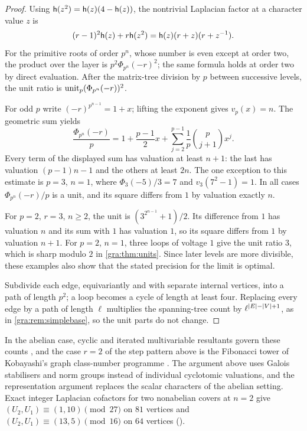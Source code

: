 \begin{proof}
Using $\mathsf{h}(z^2)=\mathsf{h}(z)(4-\mathsf{h}(z))$, the nontrivial Laplacian factor at
a character value $z$ is
\[
 (r-1)^2\mathsf{h}(z)+r\mathsf{h}(z^2)=\mathsf{h}(z)(r+z)(r+z^{-1}).
\]
For the primitive roots of order $p^n$, whose number is even except at
order two, the product over the layer is $p^2\Phi_{p^n}(-r)^2$; the same
formula holds at order two by direct evaluation. After the matrix-tree
division by $p$ between successive levels, the unit ratio is
$\operatorname{unit}_p(\Phi_{p^n}(-r))^2$.

For odd $p$ write $(-r)^{p^{n-1}}=1+x$; lifting the exponent gives
$v_p(x)=n$. The geometric sum yields
\[
 \frac{\Phi_{p^n}(-r)}p=1+\frac{p-1}2x
 +\sum_{j=2}^{p-1}\frac1p\binom p{j+1}x^j .
\]
Every term of the displayed sum has valuation at least $n+1$: the last
has valuation $(p-1)n-1$ and the others at least $2n$. The one exception
to this estimate is $p=3$, $n=1$, where $\Phi_3(-5)/3=7$ and
$v_3(7^2-1)=1$. In all cases $\Phi_{p^n}(-r)/p$ is a unit, and its square
differs from $1$ by valuation exactly $n$.

For $p=2$, $r=3$, $n\ge2$, the unit is $(3^{2^{n-1}}+1)/2$. Its
difference from $1$ has valuation $n$ and its sum with $1$ has valuation
$1$, so its square differs from $1$ by valuation $n+1$. For $p=2$, $n=1$,
three loops of voltage $1$ give the unit ratio $3$, which is sharp modulo
$2$ in \cref{gra:thm:units}. Since later levels are more divisible, these
examples also show that the stated precision for the limit is optimal.

Subdivide each edge, equivariantly and with separate internal vertices,
into a path of length $p^2$; a loop becomes a cycle of length at least
four. Replacing every edge by a path of length $\ell$ multiplies the
spanning-tree count by $\ell^{\lvert E\rvert-\lvert V\rvert+1}$, as in
\cref{gra:rem:simplebase}, so the unit parts do not change.
\end{proof}

In the abelian case, cyclic and iterated multivariable resultants govern
these counts \cite{UekiYoshizaki2022Cyclic,Yoshizaki2025Iterated}, and
the case $r=2$ of the step pattern above is the Fibonacci tower of
Kobayashi's graph class-number programme \cite{Kobayashi2025Graph}. The
argument above uses Galois stabilisers and norm groups instead of
individual cyclotomic valuations, and the representation argument
replaces the scalar characters of the abelian setting. Exact integer
Laplacian cofactors for two nonabelian covers at $n=2$ give
$(U_2,U_1)\equiv(1,10)\pmod{27}$ on $81$ vertices and
$(U_2,U_1)\equiv(13,5)\pmod{16}$ on $64$ vertices
().

